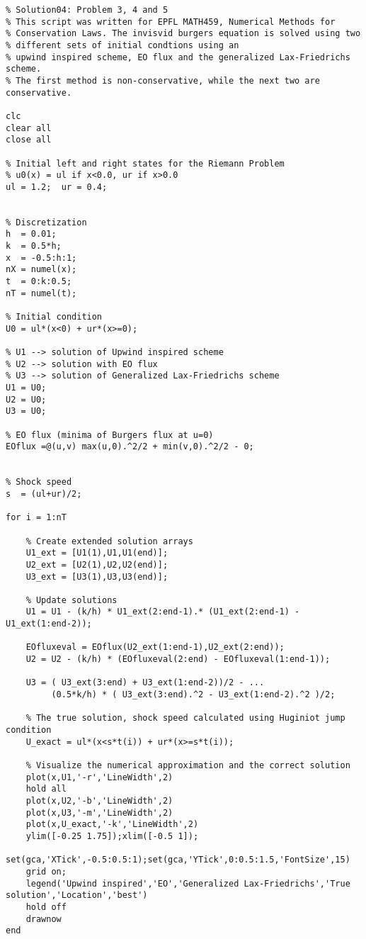 \documentclass{article}
\begin{document}
\newpage
\begin{lstlisting}
% Solution04: Problem 3, 4 and 5
% This script was written for EPFL MATH459, Numerical Methods for
% Conservation Laws. The invisvid burgers equation is solved using two 
% different sets of initial condtions using an
% upwind inspired scheme, EO flux and the generalized Lax-Friedrichs scheme. 
% The first method is non-conservative, while the next two are conservative. 

clc
clear all
close all

% Initial left and right states for the Riemann Problem
% u0(x) = ul if x<0.0, ur if x>0.0
ul = 1.2;  ur = 0.4; 


% Discretization	
h  = 0.01;
k  = 0.5*h;
x  = -0.5:h:1;
nX = numel(x);
t  = 0:k:0.5;
nT = numel(t);

% Initial condition
U0 = ul*(x<0) + ur*(x>=0);

% U1 --> solution of Upwind inspired scheme
% U2 --> solution with EO flux
% U3 --> solution of Generalized Lax-Friedrichs scheme
U1 = U0; 
U2 = U0;
U3 = U0;

% EO flux (minima of Burgers flux at u=0)
EOflux =@(u,v) max(u,0).^2/2 + min(v,0).^2/2 - 0; 


% Shock speed
s  = (ul+ur)/2; 

for i = 1:nT
    
    % Create extended solution arrays
    U1_ext = [U1(1),U1,U1(end)];
    U2_ext = [U2(1),U2,U2(end)];
    U3_ext = [U3(1),U3,U3(end)];
    
	% Update solutions
	U1 = U1 - (k/h) * U1_ext(2:end-1).* (U1_ext(2:end-1) - U1_ext(1:end-2));
    
    EOfluxeval = EOflux(U2_ext(1:end-1),U2_ext(2:end));
    U2 = U2 - (k/h) * (EOfluxeval(2:end) - EOfluxeval(1:end-1)); 
    
	U3 = ( U3_ext(3:end) + U3_ext(1:end-2))/2 - ...
         (0.5*k/h) * ( U3_ext(3:end).^2 - U3_ext(1:end-2).^2 )/2;
	
    % The true solution, shock speed calculated using Huginiot jump condition
	U_exact = ul*(x<s*t(i)) + ur*(x>=s*t(i));
    
	% Visualize the numerical approximation and the correct solution
	plot(x,U1,'-r','LineWidth',2)
    hold all
    plot(x,U2,'-b','LineWidth',2)
    plot(x,U3,'-m','LineWidth',2)
    plot(x,U_exact,'-k','LineWidth',2)
	ylim([-0.25 1.75]);xlim([-0.5 1]);
	set(gca,'XTick',-0.5:0.5:1);set(gca,'YTick',0:0.5:1.5,'FontSize',15)
	grid on;
	legend('Upwind inspired','EO','Generalized Lax-Friedrichs','True solution','Location','best')
    hold off
	drawnow	
end



\end{lstlisting}
\end{document}
